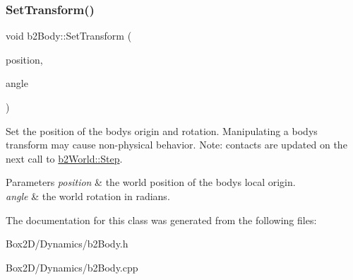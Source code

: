 \subsubsection{\texorpdfstring{Set\+Transform()}{SetTransform()}}
{\footnotesize\ttfamily void b2\+Body\+::\+Set\+Transform (\begin{DoxyParamCaption}\item[{const \hyperlink{structb2_vec2}{b2\+Vec2} \&}]{position,  }\item[{float32}]{angle }\end{DoxyParamCaption})}

Set the position of the body\textquotesingle{}s origin and rotation. Manipulating a body\textquotesingle{}s transform may cause non-\/physical behavior. Note\+: contacts are updated on the next call to \hyperlink{classb2_world_a7a8eff61af98461f978fe43f3af7be90}{b2\+World\+::\+Step}. 
\begin{DoxyParams}{Parameters}
{\em position} & the world position of the body\textquotesingle{}s local origin. \\
\hline
{\em angle} & the world rotation in radians. \\
\hline
\end{DoxyParams}


The documentation for this class was generated from the following files\+:\begin{DoxyCompactItemize}
\item 
Box2\+D/\+Dynamics/b2\+Body.\+h\item 
Box2\+D/\+Dynamics/b2\+Body.\+cpp\end{DoxyCompactItemize}
